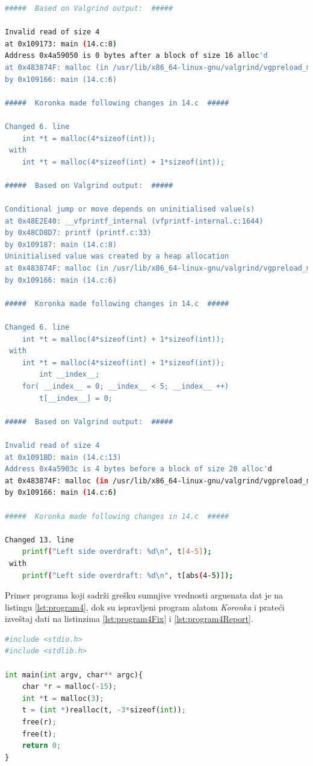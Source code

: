 \documentclass[12pt,oneside]{memoir}
\theoremstyle{plain}
\theoremstyle{definition}
\begin{document}
\begin{lstlisting}[style=terminal,caption={Izveštaj o radu alata \textit{Koronka} za program sa listinga \ref{lst:program3}}, label={lst:program3Report},language={bash}]   
#####  Based on Valgrind output:  #####

Invalid read of size 4
at 0x109173: main (14.c:8)
Address 0x4a59050 is 0 bytes after a block of size 16 alloc'd
at 0x483874F: malloc (in /usr/lib/x86_64-linux-gnu/valgrind/vgpreload_memcheck-amd64-linux.so)
by 0x109166: main (14.c:6)

#####  Koronka made following changes in 14.c  #####

Changed 6. line 
	int *t = malloc(4*sizeof(int));
 with 
	int *t = malloc(4*sizeof(int) + 1*sizeof(int));

#####  Based on Valgrind output:  #####

Conditional jump or move depends on uninitialised value(s)
at 0x48E2E40: __vfprintf_internal (vfprintf-internal.c:1644)
by 0x48CD8D7: printf (printf.c:33)
by 0x109187: main (14.c:8)
Uninitialised value was created by a heap allocation
at 0x483874F: malloc (in /usr/lib/x86_64-linux-gnu/valgrind/vgpreload_memcheck-amd64-linux.so)
by 0x109166: main (14.c:6)

#####  Koronka made following changes in 14.c  #####

Changed 6. line 
	int *t = malloc(4*sizeof(int) + 1*sizeof(int));
 with 
	int *t = malloc(4*sizeof(int) + 1*sizeof(int));
		int __index__;
	for( __index__ = 0; __index__ < 5; __index__ ++)
		t[__index__] = 0;

#####  Based on Valgrind output:  #####

Invalid read of size 4
at 0x1091BD: main (14.c:13)
Address 0x4a5903c is 4 bytes before a block of size 20 alloc'd
at 0x483874F: malloc (in /usr/lib/x86_64-linux-gnu/valgrind/vgpreload_memcheck-amd64-linux.so)
by 0x109166: main (14.c:6)

#####  Koronka made following changes in 14.c  #####

Changed 13. line 
	printf("Left side overdraft: %d\n", t[4-5]);
 with 
	printf("Left side overdraft: %d\n", t[abs(4-5)]);	
\end{lstlisting}

Primer programa koji sadrži grešku sumnjive vrednosti arguenata dat je na listingu \ref{lst:program4}, dok su ispravljeni program alatom \textit{Koronka} i prateći izveštaj dati na listinzima \ref{lst:program4Fix} i \ref{lst:program4Report}.

\begin{lstlisting}[style=mystyle,caption={Program koji sadrži grešku sumnjive vrednosti arguenata}, label={lst:program4},language={Python}] 
#include <stdio.h>
#include <stdlib.h>

int main(int argv, char** argc){
	char *r = malloc(-15);
	int *t = malloc(3);
	t = (int *)realloc(t, -3*sizeof(int)); 
	free(r);
	free(t);
	return 0;
}
\end{lstlisting}
\end{document}
